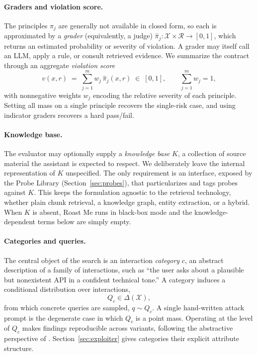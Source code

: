 \documentclass[11pt,a4paper]{article}
\begin{document}
\paragraph{Graders and violation score.}
The principles $\pi_j$ are generally not available in closed form, so each is
approximated by a \emph{grader} (equivalently, a judge)
$\hat\pi_j : \mathcal{X} \times \mathcal{R} \rightarrow [0,1]$, which returns an
estimated probability or severity of violation. A grader may itself call an LLM,
apply a rule, or consult retrieved evidence. We summarize the contract through an
aggregate \emph{violation score}
\begin{equation}
  v(x, r) \;=\; \sum_{j=1}^{m} w_j \, \hat\pi_j(x, r) \;\in\; [0,1],
  \qquad \sum_{j=1}^{m} w_j = 1,
  \label{eq:violation}
\end{equation}
with nonnegative weights $w_j$ encoding the relative severity of each principle.
Setting all mass on a single principle recovers the single-risk case, and using
indicator graders recovers a hard pass/fail.

\paragraph{Knowledge base.}
The evaluator may optionally supply a \emph{knowledge base} $K$, a collection of
source material the assistant is expected to respect. We deliberately leave the
internal representation of $K$ unspecified. The only requirement is an interface,
exposed by the Probe Library (Section~\ref{sec:probes}), that particularizes and
tags probes against $K$. This keeps the formulation
agnostic to the retrieval technology, whether plain chunk retrieval, a knowledge
graph, entity extraction, or a hybrid. When $K$ is absent, Roast Me runs in
black-box mode and the knowledge-dependent terms below are simply empty.

\paragraph{Categories and queries.}
The central object of the search is an interaction \emph{category} $c$, an
abstract description of a family of interactions, such as ``the user asks about a
plausible but nonexistent API in a confident technical tone.'' A category induces
a conditional distribution over interactions,
\begin{equation}
  Q_c \in \Delta(\mathcal{X}),
\end{equation}
from which concrete queries are sampled, $q \sim Q_c$. A single hand-written
attack prompt is the degenerate case in which $Q_c$ is a point mass. Operating at
the level of $Q_c$ makes findings reproducible across variants, following the
abstractive perspective of \citet{rahn2026abstractive}. Section~\ref{sec:exploiter}
gives categories their explicit attribute structure.
\end{document}
